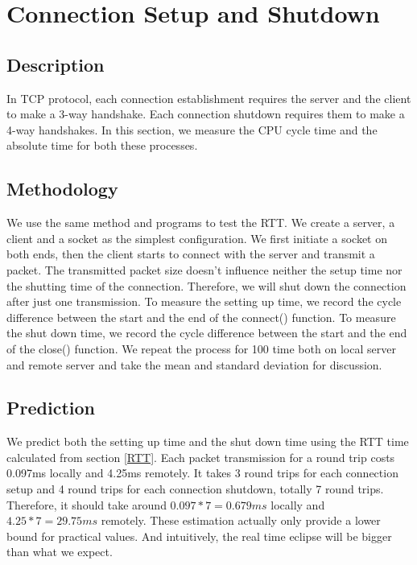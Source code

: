 \newpage
\section{Connection Setup and Shutdown}

\subsection{Description}

In TCP protocol, each connection establishment requires the server and the client to make a 3-way handshake. Each connection shutdown requires them to make a 4-way handshakes. In this section, we measure the CPU cycle time and the absolute time for both these processes. 

\subsection{Methodology}

We use the same method and programs to test the RTT. We create a server, a client and a socket as the simplest configuration. We first initiate a socket on both ends, then the client starts to connect with the server and transmit a packet. The transmitted packet size doesn't influence neither the setup time nor the shutting time of the connection. Therefore, we will shut down the connection after just one transmission. To measure the setting up time, we record the cycle difference between the start and the end of the connect() function. To measure the shut down time, we record the cycle difference between the start and the end of the close() function. We repeat the process for 100 time both on local server and remote server and take the mean and standard deviation for discussion.

\subsection{Prediction}

We predict both the setting up time and the shut down time using the RTT time calculated from section \ref{RTT}. Each packet transmission for a round trip costs 0.097ms locally and 4.25ms remotely. It takes 3 round trips for each connection setup and 4 round trips for each connection shutdown, totally 7 round trips. Therefore, it should take around $0.097 * 7 = 0.679ms$ locally and $4.25 * 7 = 29.75ms$ remotely. These estimation actually only provide a lower bound for practical values. And intuitively, the real time eclipse will be bigger than what we expect. 

